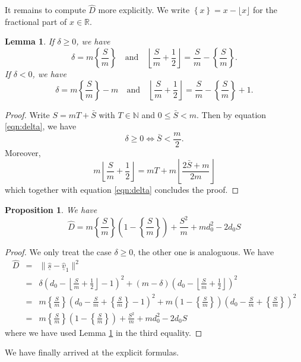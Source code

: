\documentclass[a4paper]{amsart}
\newcommand{\R}{\mathbb{R}}
\newcommand{\N}{\mathbb{N}}
\newcommand{\us}{\underline{s}}
\newcommand{\uv}{\underline{v}}
\newtheorem{prop}[thm]{Proposition}
\newtheorem{lemma}[thm]{Lemma}
\theoremstyle{plain}
\begin{document}
It remains to compute $\hat{D}$ more explicitly. We write $\left\{x\right\}=x-\lfloor x\rfloor$ for the fractional part of $x\in\R$.

\begin{lemma}\label{lem:delta}
   If $\delta\geq 0$, we have
    \[
    \delta =m\left\{\frac{S}{m}\right\}\quad \text{and}\quad \left\lfloor \frac{S}{m}+\frac{1}{2}\right\rfloor=\frac{S}{m}-\left\{\frac{S}{m}\right\}.
    \]
 If $\delta<0$, we have
\[
\delta = m\left\{\frac{S}{m}\right\}-m\quad \text{and}\quad \left\lfloor \frac{S}{m}+\frac{1}{2}\right\rfloor=\frac{S}{m}-\left\{\frac{S}{m}\right\}+1.
\]
\end{lemma}
\begin{proof}
    Write $S=mT+\bar{S}$ with $T\in \N$ and $0\leq \bar{S}<m$. Then by equation \eqref{eqn:delta}, we have
    \[
    \delta\geq 0 \Leftrightarrow \bar{S}<\frac{m}{2}.
    \]
Moreover,
\[
 m\left\lfloor \frac{S}{m}+\frac{1}{2}\right\rfloor = mT+ m\left\lfloor \frac{2\bar{S}+m}{2m}\right\rfloor 
\]
which together with equation \eqref{eqn:delta} concludes the proof.
\end{proof}

\begin{prop}\label{prop:Dhat_formula}
  We have
  \[
  \hat{D}= m\left\{\frac{S}{m}\right\}\left(1-\left\{\frac{S}{m}\right\}\right)+\frac{S^2}{m}+m d_0^2-2d_0 S
  \]
\end{prop}
\begin{proof}
    We only treat the case $\delta\geq 0$, the other one is analoguous. We have
    \begin{eqnarray*}
        \hat{D} &= &\| \hat{\us}-\hat{\uv}_1 \|^2 \\
        &= & \delta \left(d_0-\left\lfloor \frac{S}{m}+\frac{1}{2}\right\rfloor-1\right)^2+(m-\delta)\left(d_0-\left\lfloor \frac{S}{m}+\frac{1}{2}\right\rfloor\right)^2 \\
        &=& m\left\{\frac{S}{m}\right\}\left(d_0-\frac{S}{m}+\left\{\frac{S}{m}\right\}-1\right)^2+m\left(1-\left\{\frac{S}{m}\right\}\right) \left(d_0-\frac{S}{m}+\left\{\frac{S}{m}\right\}\right)^2 \\
        &=& m\left\{\frac{S}{m}\right\}\left(1-\left\{\frac{S}{m}\right\}\right)+\frac{S^2}{m}+m d_0^2-2d_0 S
    \end{eqnarray*}
where we have used Lemma \ref{lem:delta} in the third equality.
\end{proof}

We have finally arrived at the explicit formulas.
\end{document}

